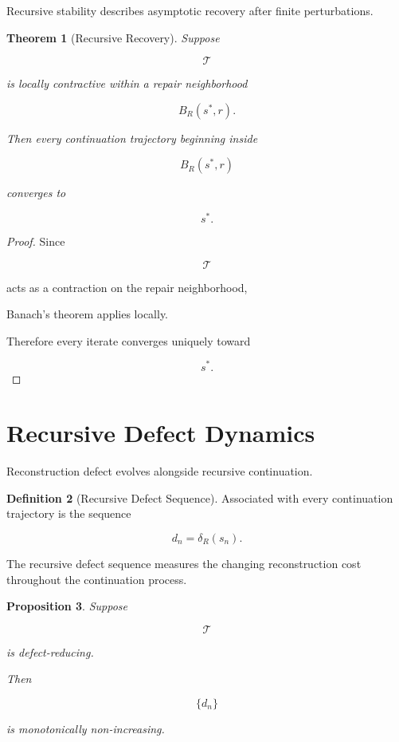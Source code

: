 \documentclass[11pt]{book}
\numberwithin{equation}{chapter}
\theoremstyle{definition}
\newtheorem{definition}{Definition}[chapter]
\theoremstyle{plain}
\newtheorem{theorem}[definition]{Theorem}
\newtheorem{proposition}[definition]{Proposition}
\begin{document}
Recursive stability describes asymptotic recovery after finite
perturbations.

\begin{theorem}[Recursive Recovery]

Suppose

\[
\mathcal T
\]

is locally contractive within a repair neighborhood

\[
B_R(s^*,r).
\]

Then every continuation trajectory beginning inside

\[
B_R(s^*,r)
\]

converges to

\[
s^*.
\]

\end{theorem}

\begin{proof}

Since

\[
\mathcal T
\]

acts as a contraction on the repair neighborhood,

Banach's theorem applies locally.

Therefore every iterate converges uniquely toward

\[
s^*.
\]

\end{proof}

\section{Recursive Defect Dynamics}

Reconstruction defect evolves alongside recursive continuation.

\begin{definition}[Recursive Defect Sequence]

Associated with every continuation trajectory is the sequence

\[
d_n
=
\delta_R(s_n).
\]

\end{definition}

The recursive defect sequence measures the changing reconstruction cost
throughout the continuation process.

\begin{proposition}

Suppose

\[
\mathcal T
\]

is defect-reducing.

Then

\[
\{d_n\}
\]

is monotonically non-increasing.

\end{proposition}
\end{document}
